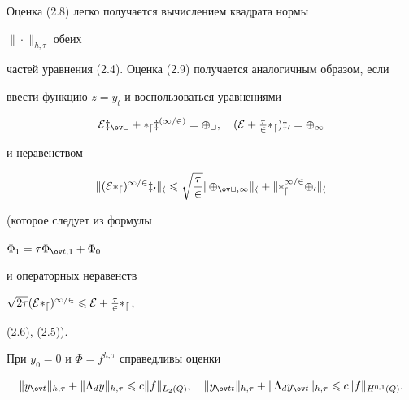 \begin{pf}


Оценка (2.8) легко получается вычислением квадрата нормы 


$\|\cdot\|_{h,\tau}$ обеих


частей уравнения (2.4). Оценка (2.9) получается аналогичным образом, если


ввести функцию $z=y_t$ и воспользоваться уравнениями


$$


\cal Ez_{\ov t}+\Lambda_d z^{(1/2)}=\Phi_t,\quad (\cal E+\tfrac{\tau}{2}


\Lambda_d)z_0=\Phi_1


$$


и неравенством


$$


\|(\cal E\Lambda_d)^{1/2}z_0\|_h\lee\sqrt{\frac{\tau}{2}}


\|\Phi_{\ov t,1}\|_h+\|\Lambda_d^{1/2}\Phi_0\|_h


$$


(которое следует из формулы 


$\Phi_1=\tau \Phi_{\ov t,1}+\Phi_0$


и операторных неравенств 


$\sqrt{2\tau}(\cal E\Lambda_d)^{1/2}\leqslant \cal E+\frac{\tau}{2}\Lambda_d$,


(2.6), (2.5)).


\end{pf}





\begin{cor}


При $y_0=0$ и $\Phi=f^{h,\tau}$ справедливы оценки


\begin{equation}


\|y_{\ov t}\|_{h,\tau}+\|\Lambda_dy\|_{h,\tau}\lee


c\|f\|_{L_2(Q)},\quad


\|y_{\ov t t}\|_{h,\tau}+\|\Lambda_d y_{\ov t}\|_{h,\tau}


\lee c\|f\|_{H^{0,1}(Q)}.


\end{equation}


\end{cor}





